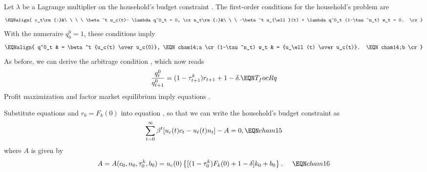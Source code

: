 \medskip

  Let $ \lambda$ be a Lagrange
multiplier on the household's budget constraint .
The first-order conditions for the household's problem are
$$\EQNalign{
c_t\rm{:}&\ \ \ \ \beta^t u_c(t)- \lambda q^0_t = 0,
                                                  \cr
n_t\rm{:}&\ \ \ -\beta^t u_{\ell}(t) + \lambda
                     q^0_t (1-\tau^n_t) w_t = 0.  \cr}
$$
With the numeraire $q^0_0=1$, these conditions imply
$$\EQNalign{ q^0_t  & = \beta^t {u_c(t) \over u_c(0)},    \EQN cham14;a \cr
   (1-\tau^n_t) w_t & = {u_\ell(t) \over u_c(t)}. \EQN cham14;b \cr}
$$
As before, we can derive the arbitrage condition , which now
reads
$$
{q^0_{t} \over q^0_{t+1}} = (1-\tau^k_{t+1}) r_{t+1} +1-\delta. \EQN T_focRq
$$
Profit maximization and factor market equilibrium imply
equations .


\medskip
{}   Substitute equations   and $r_0=F_k(0)$
 into equation ,
 so that we can write the household's budget constraint
as
$$ \sum_{t=0}^\infty \beta^t[u_c(t) c_t - u_\ell(t) n_t]
      - A = 0, \EQN cham15 $$
where $A$ is given by
$$ A = A(c_0, n_0,\tau^k_0,b_0)
               = u_c(0)
   \left\{[(1-\tau^k_0) F_k(0) + 1-\delta] k_0 + b_0 \right\}. \hskip.5cm\EQN cham16
$$


